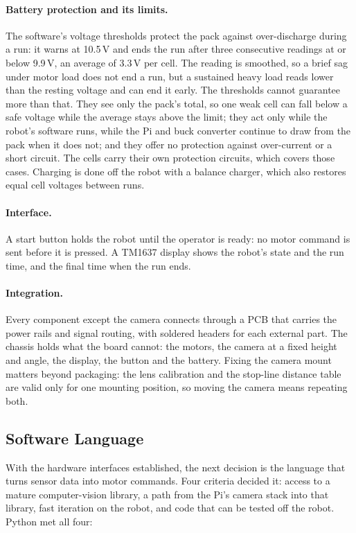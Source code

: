 \paragraph{Battery protection and its limits.}
The software's voltage thresholds protect the pack against over-discharge
during a run: it warns at 10.5\,V and ends the run after three consecutive
readings at or below 9.9\,V, an average of 3.3\,V per cell. The reading is
smoothed, so a brief sag under motor load does not end a run, but a sustained
heavy load reads lower than the resting voltage and can end it early. The
thresholds cannot guarantee more than that. They see only the pack's total, so
one weak cell can fall below a safe voltage while the average stays above the
limit; they act only while the robot's software runs, while the Pi and buck
converter continue to draw from the pack when it does not; and they offer no
protection against over-current or a short circuit. The cells carry their own
protection circuits, which covers those cases. Charging is done off the robot
with a balance charger, which also restores equal cell voltages between runs.

\paragraph{Interface.}
A start button holds the robot until the operator is ready: no motor command is
sent before it is pressed. A TM1637 display shows the robot's state and the run
time, and the final time when the run ends.

\paragraph{Integration.}
Every component except the camera connects through a PCB that carries the power
rails and signal routing, with soldered headers for each external part. The
chassis holds what the board cannot: the motors, the camera at a fixed height
and angle, the display, the button and the battery. Fixing the camera mount
matters beyond packaging: the lens calibration and the stop-line distance table
are valid only for one mounting position, so moving the camera means repeating
both.

\subsection{Software Language}
With the hardware interfaces established, the next decision is the language
that turns sensor data into motor commands. Four criteria decided it: access to
a mature computer-vision library, a path from the Pi's camera stack into that
library, fast iteration on the robot, and code that can be tested off the
robot. Python met all four:

